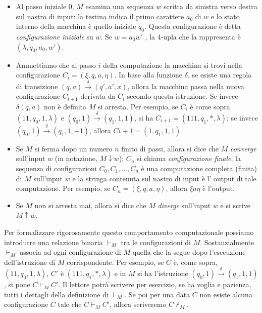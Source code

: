 \begin{itemize}
    \item Al passo iniziale $0$, $M$ esamina una sequenza $w$ scritta da sinistra
          verso destra sul nastro di input: la testina indica il primo carattere
          $a_0$ di $w$ e lo stato interno della macchina è quello iniziale $q_0$.
          Questa configurazione è detta
          \textit{configurazione iniziale} su $w$.
          Se $w = a_0w'$ , la 4-upla che la rappresenta è
          $(\lambda, q_0, a_0, w')$.
    \item Ammettiamo che al passo $i$ della computazione la macchina si trovi
          nella
          configurazione $C_i = (\xi, q, a, \eta)$.
          In base alla funzione $\delta$, se esiste una regola di transizione
          $(q, a) \xrightarrow{ \ \delta \ }  (q', a', x)$,
          allora la macchina passa nella nuova configurazione $C_{i+1}$ derivata
          da $C_i$ secondo questa istruzione. Se invece $\delta(q, a)$
          non è definita $M$ si arresta.
          Per esempio, se $C_i$ è come sopra
          $(11, q_0, 1, \lambda)$ e
          $(q_0, 1) \xrightarrow{ \ \delta \ }  (q_1, 1, 1)$, si ha
          $C_{i+1} = (111, q_1, *, \lambda)$; se invece
          $(q_0, 1) \xrightarrow{ \ \delta \ }  (q_1, 1, -1)$,
          allora $C{i+1}= (1, q_1, 1, 1)$.
    \item Se $M$ si ferma dopo un numero $n$ finito di passi,
          allora si dice che $M$ \textit{converge}
          sull'input $w$ (in notazione, $M \downarrow w$);
          $C_n$ si chiama \textit{configurazione finale}, la
          sequenza di configurazioni $C_0, C_1, ..., C_n$ è una computazione
          completa (finita)
          di $M$ sull'input $w$ e la stringa contenuta sul nastro di input è l'
          output di tale computazione.
          Per esempio, se $C_n = (\xi, q, a, \eta)$, allora $\xi a \eta$ è l'output.
    \item Se $M$ non si arresta mai, allora si dice che $M$ \textit{diverge}
          sull'input $w$ e si scrive
          $M \uparrow w$.
\end{itemize}

Per formalizzare rigorosamente questo comportamento computazionale possiamo
introdurre una relazione binaria $\vdash_M$ tra le configurazioni di $M$.
Sostanzialmente $\vdash_M$ associa ad ogni configurazione di $M$ quella che la
segue dopo l'esecuzione dell'istruzione di $M$ corrispondente.
Per esempio, se $C$ è, come sopra, $(11, q_0, 1, \lambda)$, $C'$ è
$(111, q_1, *, \lambda)$ e in $M$ si ha l'istruzione
$(q_0, 1) \xrightarrow{ \ \delta \ } (q_1, 1 , 1)$, si
pone $C \vdash_M C'$.
Il lettore potrà scrivere per esercizio, se ha voglia e pazienza,
tutti i dettagli della definizione di $\vdash_M$.
Se poi per una data $C$ non esiste alcuna configurazione $C$ tale che
$C \vdash_M C'$,
allora scriveremo $C \nvdash_M$.
